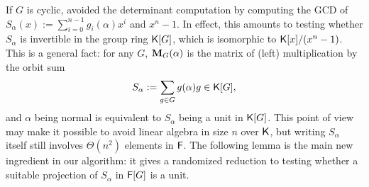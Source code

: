 If $G$ is cyclic, \cite{GatGie90} avoided the determinant
computation by computing the GCD of $S_\alpha(x) := \sum_{i = 0}^{n-1}
g_i(\alpha)x^i$ and $x^n-1$. In effect, this amounts to testing
whether $S_\alpha$ is invertible in the group ring ${\mathsf{K}}[G]$, which is
isomorphic to ${\mathsf{K}}[x]/(x^n-1)$. This is a general fact: for any $G$,
$\mat M_G(\alpha)$ is the matrix of (left) multiplication by the orbit
sum
$$S_\alpha:= \sum_{g \in G} g(\alpha)g \in {\mathsf{K}}[G],$$ and $\alpha$ being
normal is equivalent to $S_\alpha$ being a unit in ${\mathsf{K}}[G]$. This point
of view may make it possible to avoid linear algebra in size $n$ over
${\mathsf{K}}$, but writing $S_\alpha$ itself still involves $\Theta(n^2)$
elements in ${\mathsf{F}}$. The following lemma is the main new ingredient 
in our algorithm: it gives a randomized reduction to testing
whether a suitable projection of $S_\alpha$ in ${\mathsf{F}}[G]$ is a unit.
 


